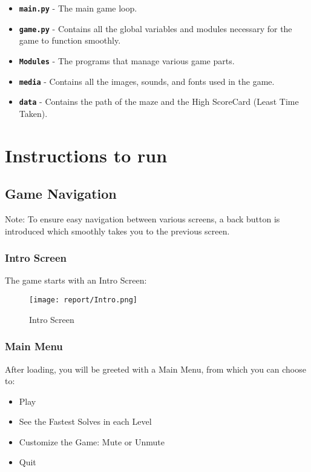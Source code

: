 \documentclass{article}
\begin{document}
\begin{itemize}
    \item \textbf{\texttt{main.py}} - The main game loop.
    \item \textbf{\texttt{game.py}} - Contains all the global variables and modules necessary for the game to function smoothly.
    \item \textbf{\texttt{Modules}} - The programs that manage various game parts.
    \item \textbf{\texttt{media}} - Contains all the images, sounds, and fonts used in the game.
    \item \textbf{\texttt{data}} - Contains the path of the maze and the High ScoreCard (Least Time Taken).
\end{itemize}

\section{Instructions to run}
\subsection{Game Navigation}
Note: To ensure easy navigation between various screens, a back button is introduced which smoothly takes you to the previous screen.

\subsubsection{Intro Screen}
The game starts with an Intro Screen:

\begin{figure}[h]
    \centering
    \texttt{[image: report/Intro.png]}
    \caption{Intro Screen}
\end{figure}

\subsubsection{Main Menu}
After loading, you will be greeted with a Main Menu, from which you can choose to:

\begin{itemize}
    \item Play
    \item See the Fastest Solves in each Level
    \item Customize the Game: Mute or Unmute
    \item Quit
\end{itemize}
\end{document}
